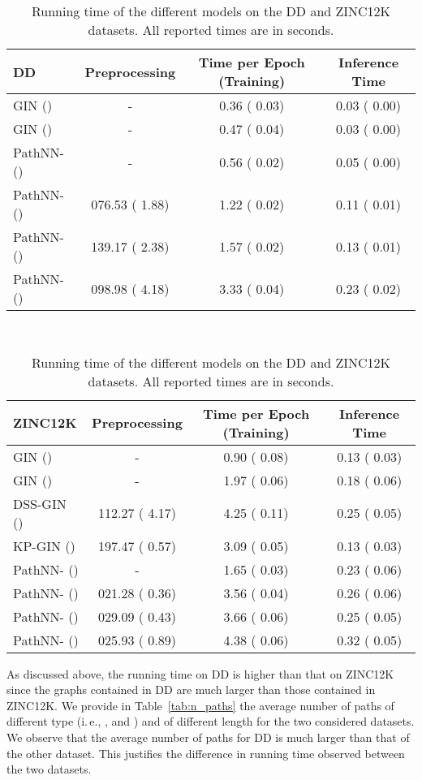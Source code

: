\documentclass{article}
\theoremstyle{plain}
\theoremstyle{definition}
\theoremstyle{remark}
\newcommand{\ie}{i.\,e., }
\begin{document}
\begin{table}[t]
\caption{Running time of the different models on the DD and ZINC12K datasets. All reported times are in seconds.}
\label{tab:running_time}
\centering
\scriptsize
\renewcommand{\arraystretch}{1.2}
\begin{tabular}{l|ccc}
\toprule
DD & Preprocessing & Time per Epoch (Training) & Inference Time \\
\midrule
GIN () & - & 0.36 ( 0.03) & 0.03 ( 0.00) \\
GIN () & - & 0.47 ( 0.04) & 0.03 ( 0.00) \\
\midrule
PathNN- () & - & 0.56 ( 0.02) & 0.05 ( 0.00) \\
PathNN- () & {\color{white} 0}76.53 ( 1.88) & 1.22 ( 0.02) & 0.11 ( 0.01) \\
PathNN- () & 139.17 ( 2.38) & 1.57 ( 0.02) & 0.13 ( 0.01) \\
PathNN- () & {\color{white} 0}98.98 ( 4.18) & 3.33 ( 0.04) & 0.23 ( 0.02) \\
\bottomrule
\end{tabular}\\
\vspace{.1cm}
\begin{tabular}{l|ccc}
\toprule
ZINC12K & Preprocessing & Time per Epoch (Training) & Inference Time \\
\midrule
GIN () & - & 0.90 ( 0.08) & 0.13 ( 0.03) \\
GIN () & - & 1.97 ( 0.06) & 0.18 ( 0.06) \\
DSS-GIN () & 112.27 ( 4.17) & 4.25 ( 0.11) & 0.25 ( 0.05) \\
KP-GIN () & 197.47 ( 0.57) & 3.09 ( 0.05) & 0.13 ( 0.03) \\
\midrule
PathNN- () & - & 1.65 ( 0.03) & 0.23 ( 0.06) \\
PathNN- () & {\color{white} 0}21.28 ( 0.36) & 3.56 ( 0.04) & 0.26 ( 0.06) \\
PathNN- () & {\color{white} 0}29.09 ( 0.43) & 3.66 ( 0.06) & 0.25 ( 0.05) \\
PathNN- () & {\color{white} 0}25.93 ( 0.89) & 4.38 ( 0.06) & 0.32 ( 0.05) \\
\bottomrule
\end{tabular}
\end{table}

As discussed above, the running time on DD is higher than that on ZINC12K since the graphs contained in DD are much larger than those contained in ZINC12K.
We provide in Table~\ref{tab:n_paths} the average number of paths of different type (\ie ,  and ) and of different length for the two considered datasets.
We observe that the average number of paths for DD is much larger than that of the other dataset.
This justifies the difference in running time observed between the two datasets.
\end{document}

